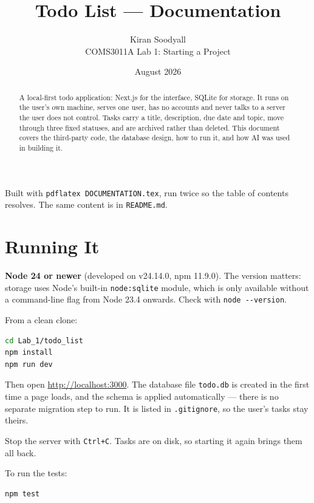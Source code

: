 \documentclass[11pt,a4paper]{article}
\title{Todo List --- Documentation}
\author{Kiran Soodyall \\ COMS3011A Lab 1: Starting a Project}
\date{August 2026}
\begin{document}
\maketitle

\begin{center}
\small Built with \texttt{pdflatex DOCUMENTATION.tex}, run twice so the table of
contents resolves. The same content is in \texttt{README.md}.
\end{center}

\begin{abstract}
\noindent A local-first todo application: Next.js for the interface, SQLite for
storage. It runs on the user's own machine, serves one user, has no accounts and
never talks to a server the user does not control. Tasks carry a title,
description, due date and topic, move through three fixed statuses, and are
archived rather than deleted. This document covers the third-party code, the
database design, how to run it, and how AI was used in building it.
\end{abstract}

\tableofcontents

\section{Running It}

\textbf{Node 24 or newer} (developed on v24.14.0, npm 11.9.0). The version
matters: storage uses Node's built-in \texttt{node:sqlite} module, which is only
available without a command-line flag from Node 23.4 onwards. Check with
\texttt{node -{}-version}.

From a clean clone:

\begin{lstlisting}[language=bash]
cd Lab_1/todo_list
npm install
npm run dev
\end{lstlisting}

Then open \url{http://localhost:3000}. The database file \texttt{todo.db} is
created in  the first time a page loads, and the schema
is applied automatically --- there is no separate migration step to run. It is
listed in \texttt{.gitignore}, so the user's tasks stay theirs.

Stop the server with \texttt{Ctrl+C}. Tasks are on disk, so starting it again
brings them all back.

To run the tests:

\begin{lstlisting}[language=bash]
npm test
\end{lstlisting}
\end{document}
